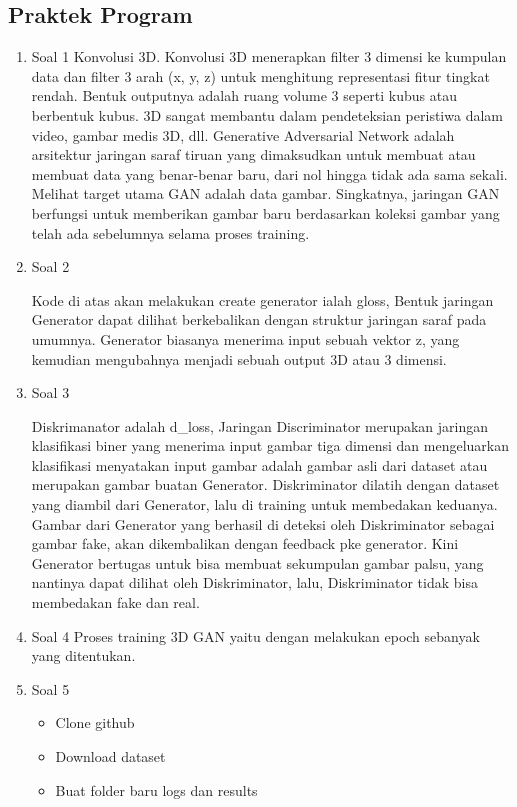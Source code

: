 \subsection{Praktek Program}
\begin{enumerate}
    \item Soal 1
    \hfill\break
    Konvolusi 3D. Konvolusi 3D menerapkan filter 3 dimensi ke kumpulan data dan filter 3 arah (x, y, z) untuk menghitung representasi fitur tingkat rendah. Bentuk outputnya adalah ruang volume 3 seperti kubus atau berbentuk kubus. 3D sangat membantu dalam pendeteksian peristiwa dalam video, gambar medis 3D, dll. Generative Adversarial Network adalah arsitektur jaringan saraf tiruan yang dimaksudkan untuk membuat atau membuat data yang benar-benar baru, dari nol hingga tidak ada sama sekali. Melihat target utama GAN adalah data gambar. Singkatnya, jaringan GAN berfungsi untuk memberikan gambar baru berdasarkan koleksi gambar yang telah ada sebelumnya selama proses training.

    \item Soal 2
	\hfill\break
	
	Kode di atas akan melakukan create generator ialah gloss, Bentuk jaringan Generator dapat dilihat berkebalikan dengan struktur jaringan saraf pada umumnya. Generator biasanya menerima input sebuah vektor z, yang kemudian mengubahnya menjadi sebuah output 3D atau 3 dimensi.

    \item Soal 3
	\hfill\break
	
	Diskrimanator adalah d\_loss, Jaringan Discriminator merupakan jaringan klasifikasi biner yang menerima input gambar tiga dimensi dan mengeluarkan klasifikasi menyatakan input gambar adalah gambar asli dari dataset atau merupakan gambar buatan Generator. Diskriminator dilatih dengan dataset yang diambil dari Generator, lalu di training untuk membedakan keduanya. Gambar dari Generator yang berhasil di deteksi oleh Diskriminator sebagai gambar fake, akan dikembalikan dengan feedback pke generator. Kini Generator bertugas untuk bisa membuat sekumpulan gambar palsu, yang nantinya dapat dilihat oleh Diskriminator, lalu, Diskriminator tidak bisa membedakan fake dan real.

    \item Soal 4
	\hfill\break
    Proses training 3D GAN yaitu dengan melakukan epoch sebanyak yang ditentukan.
    
    \item Soal 5
	\hfill\break
	\begin{itemize}
		\item Clone github
		\item Download dataset
		\item Buat folder baru logs dan results
	\end{itemize}


\end{enumerate}
